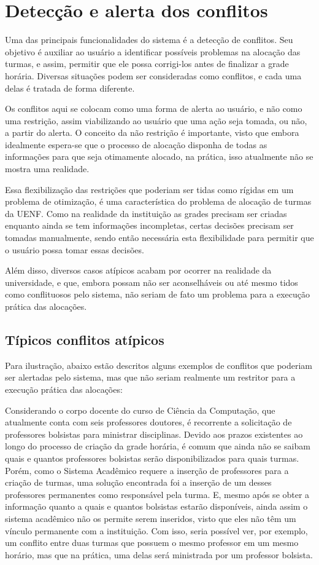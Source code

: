 \section{Detecção e alerta dos conflitos} \label{sec:conflitos} %

Uma das principais funcionalidades do sistema é a detecção de conflitos. Seu objetivo é auxiliar ao usuário a identificar possíveis problemas na alocação das turmas, e assim, permitir que ele possa corrigi-los antes de finalizar a grade horária. Diversas situações podem ser consideradas como conflitos, e cada uma delas é tratada de forma diferente.

Os conflitos aqui se colocam como uma forma de alerta ao usuário, e não como uma restrição, assim viabilizando ao usuário que uma ação seja tomada, ou não, a partir do alerta. O conceito da não restrição é importante, visto que embora idealmente espera-se que o processo de alocação disponha de todas as informações para que seja otimamente alocado, na prática, isso atualmente não se mostra uma realidade.

Essa flexibilização das restrições que poderiam ser tidas como rígidas em um problema de otimização, é uma característica do problema de alocação de turmas da UENF. Como na realidade da instituição as grades precisam ser criadas enquanto ainda se tem informações incompletas, certas decisões precisam ser tomadas manualmente, sendo então necessária esta flexibilidade para permitir que o usuário possa tomar essas decisões.

Além disso, diversos casos atípicos acabam por ocorrer na realidade da universidade, e que, embora possam não ser aconselháveis ou até mesmo tidos como conflituosos pelo sistema, não seriam de fato um problema para a execução prática das alocações.

\subsection{Típicos conflitos atípicos}

Para ilustração, abaixo estão descritos alguns exemplos de conflitos que poderiam ser alertadas pelo sistema, mas que não seriam realmente um restritor para a execução prática das alocações:

Considerando o corpo docente do curso de Ciência da Computação, que atualmente conta com seis professores doutores, é recorrente a solicitação de professores bolsistas para ministrar disciplinas. Devido aos prazos existentes ao longo do processo de criação da grade horária, é comum que ainda não se saibam quais e quantos professores bolsistas serão disponibilizados para quais turmas. Porém, como o Sistema Acadêmico requere a inserção de professores para a criação de turmas, uma solução encontrada foi a inserção de um desses professores permanentes como responsável pela turma. E, mesmo após se obter a informação quanto a quais e quantos bolsistas estarão disponíveis, ainda assim o sistema acadêmico não os permite serem inseridos, visto que eles não têm um vínculo permanente com a instituição. Com isso, seria possível ver, por exemplo, um conflito entre duas turmas que possuem o mesmo professor em um mesmo horário, mas que na prática, uma delas será ministrada por um professor bolsista.

